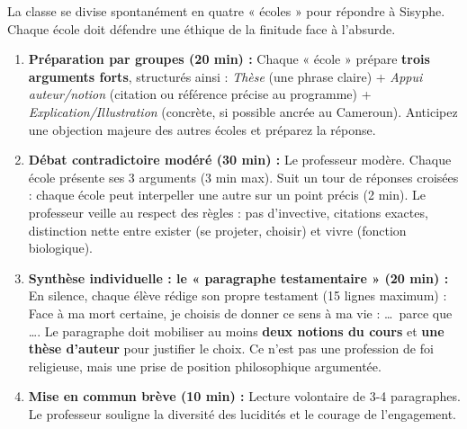\documentclass[11pt]{article}
\newcommand{\cle}[1]{{\popxbold\color{popdark}#1}}
\newcounter{popsec}
\newcounter{popsub}
\newcommand{\courssub}[1]{%
  \stepcounter{popsub}%
  \par\vspace{9pt}\noindent{\popxbold\fontsize{11.5}{13}\selectfont\color{popink}{\color{poporange}\thepopsec.\thepopsub}\hspace{6pt}#1}\par\nopagebreak\vspace{4pt}
}
\begin{document}
La classe se divise spontanément en quatre « écoles » pour répondre à Sisyphe. Chaque école doit défendre une éthique de la finitude face à l'absurde.

\courssub{Consignes}
\begin{enumerate}
    \item \textbf{Préparation par groupes (20 min) :} Chaque « école » prépare \textbf{trois arguments forts}, structurés ainsi : \textit{Thèse} (une phrase claire) + \textit{Appui auteur/notion} (citation ou référence précise au programme) + \textit{Explication/Illustration} (concrète, si possible ancrée au Cameroun). Anticipez une objection majeure des autres écoles et préparez la réponse.
    \item \textbf{Débat contradictoire modéré (30 min) :} Le professeur modère. Chaque école présente ses 3 arguments (3 min max). Suit un tour de réponses croisées : chaque école peut interpeller une autre sur un point précis (2 min). Le professeur veille au respect des règles : pas d'invective, citations exactes, distinction nette entre \cle{exister} (se projeter, choisir) et \cle{vivre} (fonction biologique).
    \item \textbf{Synthèse individuelle : le « paragraphe testamentaire » (20 min) :} En silence, chaque élève rédige son propre testament (15 lignes maximum) : \guillemotleft Face à ma mort certaine, je choisis de donner ce sens à ma vie : \dots \ parce que \dots \guillemotright. Le paragraphe doit mobiliser au moins \textbf{deux notions du cours} et \textbf{une thèse d'auteur} pour justifier le choix. Ce n'est pas une profession de foi religieuse, mais une \cle{prise de position philosophique} argumentée.
    \item \textbf{Mise en commun brève (10 min) :} Lecture volontaire de 3-4 paragraphes. Le professeur souligne la diversité des lucidités et le courage de l'engagement.
\end{enumerate}
\end{document}
